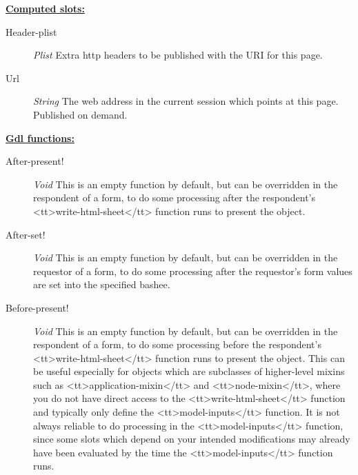 \documentclass [11pt]{book}
\begin{document}
\begin{itemize}
\begin{description}
\end{description}






\textbf{
\underline{Computed slots:}}

\begin{description}

\item [Header-plist]
\emph{Plist} Extra http headers to be published with the URI for this page.


\item [Url]
\emph{String} The web address in the current session which points at this page. Published on demand.


\end{description}






\textbf{
\underline{Gdl functions:}}

\begin{description}

\item [After-present!]
\emph{Void} This is an empty function by default, but can be overridden in
the respondent of a form, to do some processing after the respondent's
<tt>write-html-sheet</tt> function runs to present the object.


\item [After-set!]
\emph{Void} This is an empty function by default, but can be overridden in
the requestor of a form, to do some processing after the requestor's form
values are set into the specified bashee.


\item [Before-present!]
\emph{Void} This is an empty function by default, but can be overridden in
the respondent of a form, to do some processing before the respondent's
<tt>write-html-sheet</tt> function runs to present the object. This can be
useful especially for objects which are subclasses of higher-level mixins such as
<tt>application-mixin</tt> and <tt>node-mixin</tt>, where you do not have
direct access to the <tt>write-html-sheet</tt> function and typically only define
the <tt>model-inputs</tt> function. It is not always reliable to do processing
in the <tt>model-inputs</tt> function, since some slots which depend on your
intended modifications may already have been evaluated by the time the
<tt>model-inputs</tt> function runs.



\end{description}
\end{itemize}
\end{document}
